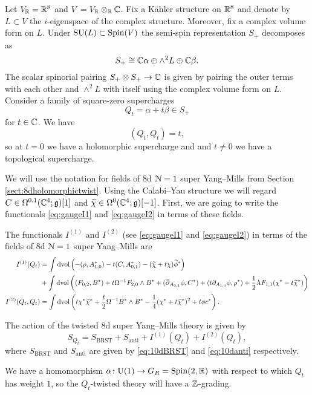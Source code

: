 \documentclass[10pt, oneside]{article}
\renewcommand{\U}{\mathrm{U}}
\begin{document}
Let $V_\mathbb R = \mathbb R^8$ and $V=V_\mathbb R\otimes_\mathbb R\mathbb C$. Fix a K\"ahler structure on $\mathbb R^8$ and denote by $L\subset V$ the $i$-eigenspace of the complex structure. Moreover, fix a complex volume form on $L$. Under $\mathrm{SU}(L)\subset \mathrm{Spin}(V)$ the semi-spin representation $S_+$ decomposes as
\[S_+\cong \mathbb C \alpha\oplus \wedge^2 L\oplus \mathbb C \beta.\]
The scalar spinorial pairing $S_+\otimes S_+\rightarrow \mathbb C$ is given by pairing the outer terms with each other and $\wedge^2L$ with itself using the complex volume form on $L$. Consider a family of square-zero supercharges
\begin{equation}
Q_t = \alpha + t\beta\in S_+
\label{eq:8dHodgefamily}
\end{equation}
for $t\in\mathbb C$. We have
\[(Q_t, Q_t) = t,\]
so at $t=0$ we have a holomorphic supercharge and and $t\neq 0$ we have a topological supercharge.

We will use the notation for fields of 8d $\mathcal N=1$ super Yang--Mills from Section \ref{sect:8dholomorphictwist}. Using the Calabi--Yau structure we will regard $C\in\Omega^{0, 1}(\mathbb C^4;\mathfrak g)[1]$ and $\widetilde{\chi}\in\Omega^0(\mathbb C^4;\mathfrak g)[-1]$. First, we are going to write the functionals \eqref{eq:gaugeI1} and \eqref{eq:gaugeI2} in terms of these fields.

\begin{prop}
The functionals $I^{(1)}$ and $I^{(2)}$ (see \eqref{eq:gaugeI1} and \eqref{eq:gaugeI2}) in terms of the fields of 8d $\mathcal N=1$ super Yang--Mills are
\begin{align*}
I^{(1)}(Q_t) &= \int \operatorname{dvol}\left(-(\rho, A_{1, 0}^*) - t(C, A_{0, 1}^*) - (\widetilde{\chi} + t\chi)\widetilde{\phi}^*\right) \\
&+ \int\operatorname{dvol}\left((F_{0, 2}, B^*) + t\Omega^{-1} F_{2, 0}\wedge B^* + (\overline{\partial}_{A_{0, 1}}\phi, C^*) + (t\partial_{A_{1, 0}} \phi, \rho^*) + \frac{1}{2}\Lambda F_{1, 1}(\chi^* - t\widetilde{\chi}^*)\right) \\
I^{(2)}(Q_t, Q_t) &= \int \operatorname{dvol} \left(t\chi^*\widetilde{\chi}^* + \frac{t}{2}\Omega^{-1}B^*\wedge B^* -\frac{1}{4}(\chi^* + t\widetilde{\chi}^*)^2 + t\phi c^*\right).
\end{align*}
\end{prop}

The action of the twisted 8d super Yang--Mills theory is given by
\[S_{Q_t} = S_{\mathrm{BRST}} + S_{\mathrm{anti}} + I^{(1)}(Q_t) + I^{(2)}(Q_t),\]
where $S_{\mathrm{BRST}}$ and $S_{\mathrm{anti}}$ are given by \eqref{eq:10dBRST} and \eqref{eq:10danti} respectively.

We have a homomorphism $\alpha\colon \U(1)\rightarrow G_R=\Spin(2, \RR)$ with respect to which $Q_t$ has weight $1$, so the $Q_t$-twisted theory will have a $\mathbb Z$-grading.
\end{document}
